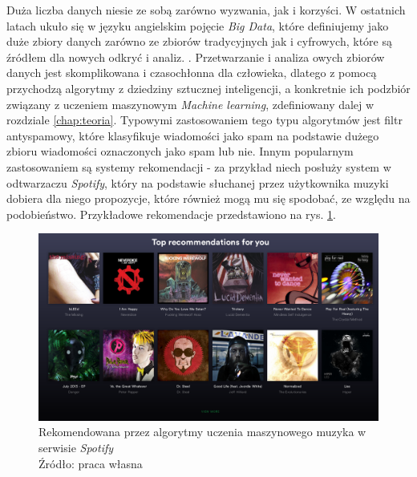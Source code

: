 Duża liczba danych niesie ze sobą zarówno wyzwania, jak i korzyści.
W ostatnich latach ukuło się w języku angielskim pojęcie \textit{Big Data}, które definiujemy jako duże zbiory danych zarówno ze zbiorów tradycyjnych jak i cyfrowych, które są źródłem dla nowych odkryć i analiz. \cite{Arthur2013}.
Przetwarzanie i analiza owych zbiorów danych jest skomplikowana i czasochłonna dla człowieka, dlatego z pomocą przychodzą algorytmy z dziedziny sztucznej inteligencji, a konkretnie ich podzbiór związany z uczeniem maszynowym \textit{Machine learning}, zdefiniowany dalej w rozdziale \ref{chap:teoria}.
Typowymi zastosowaniem tego typu algorytmów jest filtr antyspamowy, które klasyfikuje wiadomości jako spam na podstawie dużego zbioru wiadomości oznaczonych jako spam lub nie.
Innym popularnym zastosowaniem są systemy rekomendacji - za przykład niech posłuży system w odtwarzaczu \textit{Spotify}, który na podstawie słuchanej przez użytkownika muzyki dobiera dla niego propozycje, które również mogą mu się spodobać, ze względu na podobieństwo.
Przykładowe rekomendacje przedstawiono na rys. \ref{fig:recommendations}.

\begin{figure}[h!tb]
	 \centering
	 \includegraphics[width = 1.0\linewidth]{img/recommendations}
	 \caption{Rekomendowana przez algorytmy uczenia maszynowego muzyka w serwisie \textit{Spotify} \\
              Źródło: praca własna}
	 \label{fig:recommendations}
\end{figure}

